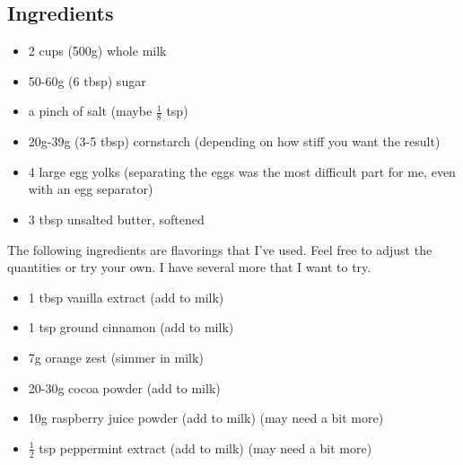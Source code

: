 \documentclass[10pt, openany]{book}
\begin{document}
\subsection{Ingredients}
\begin{itemize}
  \item 2 cups (500g) whole milk
  \item 50-60g (6 tbsp) sugar
  \item a pinch of salt (maybe $\frac{1}{8}$ tsp)
  \item 20g-39g (3-5 tbsp) cornstarch (depending on how stiff you want the result)
  \item 4 large egg yolks (separating the eggs was the most difficult part for me, even with an egg separator)
  \item 3 tbsp unsalted butter, softened
\end{itemize}
The following ingredients are flavorings that I've used.  Feel free to adjust the quantities or try your own.  I have several more that I want to try.
\begin{itemize}
  \item 1 tbsp vanilla extract (add to milk)
  \item 1 tsp ground cinnamon (add to milk)
  \item 7g orange zest (simmer in milk)
  \item 20-30g cocoa powder (add to milk)
  \item 10g raspberry juice powder (add to milk) (may need a bit more)
  \item $\frac{1}{2}$ tsp peppermint extract (add to milk) (may need a bit more)
\end{itemize}
\end{document}

